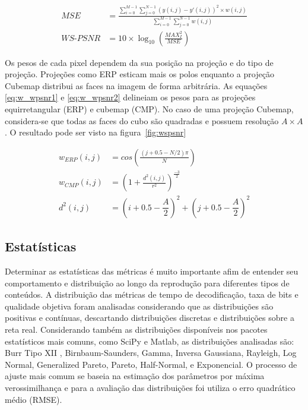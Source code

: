 \begin{align}
        \label{eq:WMSE}
        MSE&= \frac{\sum^{M-1}_{i=0}\sum^{N-1}_{j=0} \left(y(i,j) - y'(i,j)\right)^2 \times w(i,j)}{\sum^{M-1}_{i=0} \sum^{N-1}_{j=0} w(i,j)}\\[12pt]
        \label{eq:WS-PSNR}
        WS\mbox{-}PSNR&=10 \times \log_{10}\left(\frac{MAX^2_I}{MSE}\right)
\end{align}

Os pesos de cada pixel dependem da sua posição na projeção e do tipo de projeção. Projeções como ERP esticam mais os polos enquanto a projeção Cubemap distribui as faces na imagem de forma arbitrária. As equações \ref{eq:w_wpsnr1} e \ref{eq:w_wpsnr2} delineiam os pesos para as projeções equirretangular (ERP) e cubemap (CMP). No caso de uma projeção Cubemap, considera-se que todas as faces do cubo são quadradas e possuem resolução $A \times A$. O resultado pode ser visto na figura~\ref{fig:wspsnr}

\begin{align}
        \label{eq:w_wpsnr1}
        w_{ERP}(i,j)&=cos\left(\frac{(j+0.5-N/2)\pi}{N}\right) \\
        \label{eq:w_wpsnr2}
        w_{CMP}(i,j)&=\left(1 + \frac{d^2(i,j)}{r^2}\right)^{\frac{-3}{2}} \\
        d^2(i, j)&=(i+0.5-\dfrac{A}{2})^2 +(j+0.5-\dfrac{A}{2})^2
\end{align}

\subsection{Estatísticas}

Determinar as estatísticas das métricas é muito importante afim de entender seu comportamento e distribuição ao longo da reprodução para diferentes tipos de conteúdos. A distribuição das métricas de tempo de decodificação, taxa de bits e qualidade objetiva foram analisadas considerando que as distribuições são positivas e contínuas, descartando distribuições discretas e distribuições sobre a reta real. Considerando também as distribuições disponíveis nos pacotes estatísticos mais comuns, como SciPy e Matlab, as distribuições analisadas são: Burr Tipo XII , Birnbaum-Saunders, Gamma, Inversa Gaussiana, Rayleigh, Log Normal, Generalized Pareto, Pareto, Half-Normal, e Exponencial. O processo de ajuste mais comum se baseia na estimação dos parâmetros por máxima verossimilhança e para a avaliação das distribuições foi utiliza o erro quadrático médio (RMSE).

